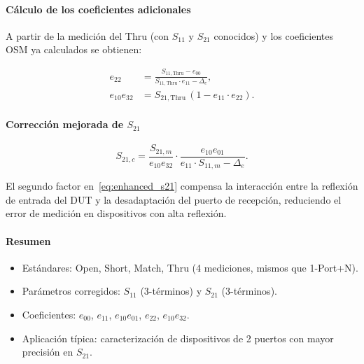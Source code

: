 \paragraph{Cálculo de los coeficientes adicionales}

A partir de la medición del Thru (con $S_{11}$ y $S_{21}$ conocidos) y los
coeficientes OSM ya calculados se obtienen:

\begin{align}
    e_{22} &= \frac{S_{11,\text{Thru}} - e_{00}}
                   {S_{11,\text{Thru}}\cdot e_{11} - \Delta_e},
    \label{eq:e22} \\[4pt]
    e_{10}e_{32} &= S_{21,\text{Thru}}\,(1 - e_{11}\cdot e_{22}).
    \label{eq:e10e32}
\end{align}

\paragraph{Corrección mejorada de $S_{21}$}

\begin{equation}
    S_{21,c} = \frac{S_{21,m}}{e_{10}e_{32}}
               \cdot
               \frac{e_{10}e_{01}}{e_{11}\cdot S_{11,m} - \Delta_e}.
    \label{eq:enhanced_s21}
\end{equation}

El segundo factor en~\eqref{eq:enhanced_s21} compensa la interacción entre
la reflexión de entrada del DUT y la desadaptación del puerto de recepción,
reduciendo el error de medición en dispositivos con alta reflexión.

\paragraph{Resumen}

\begin{itemize}
    \item Estándares: Open, Short, Match, Thru (4 mediciones, mismos que 1-Port+N).
    \item Parámetros corregidos: $S_{11}$ (3-términos) y $S_{21}$ (3-términos).
    \item Coeficientes: $e_{00}$, $e_{11}$, $e_{10}e_{01}$, $e_{22}$, $e_{10}e_{32}$.
    \item Aplicación típica: caracterización de dispositivos de 2 puertos con
          mayor precisión en $S_{21}$.
\end{itemize}

\newpage
\Encabezado

